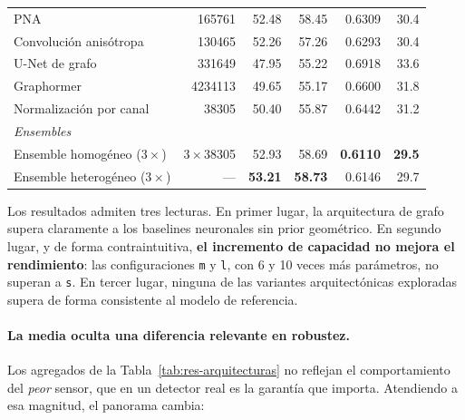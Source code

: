 \begin{table}[htbp]
\begin{tabular}{lrrrrr}
\quad PNA & \num{165761} & 52.48 & 58.45 & 0.6309 & 30.4 \\
\quad Convolución anisótropa & \num{130465} & 52.26 & 57.26 & 0.6293 & 30.4 \\
\quad U-Net de grafo & \num{331649} & 47.95 & 55.22 & 0.6918 & 33.6 \\
\quad Graphormer & \num{4234113} & 49.65 & 55.17 & 0.6600 & 31.8 \\
\quad Normalización por canal & \num{38305} & 50.40 & 55.87 & 0.6442 & 31.2 \\
\midrule
\multicolumn{6}{l}{\emph{Ensembles}} \\
\quad Ensemble homogéneo ($3\times$) & $3\times$\num{38305} & 52.93 & 58.69 & \textbf{0.6110} & \textbf{29.5} \\
\quad Ensemble heterogéneo ($3\times$) & --- & \textbf{53.21} & \textbf{58.73} & 0.6146 & 29.7 \\
\bottomrule
\end{tabular}
\end{table}


Los resultados admiten tres lecturas. En primer lugar, la arquitectura de grafo supera claramente a
los baselines neuronales sin prior geométrico. En segundo lugar, y de forma contraintuitiva,
\textbf{el incremento de capacidad no mejora el rendimiento}: las configuraciones \texttt{m} y
\texttt{l}, con 6 y 10 veces más parámetros, no superan a \texttt{s}. En tercer lugar, ninguna de las
variantes arquitectónicas exploradas supera de forma consistente al modelo de referencia.

\paragraph{La media oculta una diferencia relevante en robustez.} Los agregados de la
Tabla~\ref{tab:res-arquitecturas} no reflejan el comportamiento del \emph{peor} sensor, que en un
detector real es la garantía que importa. Atendiendo a esa magnitud, el panorama cambia:

